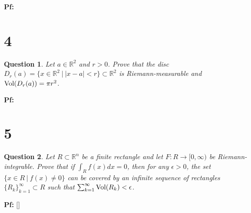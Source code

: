 \documentclass{article}
\newtheorem{question}{Question}
\begin{document}
\textbf{Pf:}

\break

\section*{4}
\begin{myBox}[]{}
    \begin{question}
        Let $a\in\mathbb{R}^2$ and $r>0$. Prove that the disc $D_r(a)=\{x\in\mathbb{R}^2\ |\ |x-a|<r\}\subset\mathbb{R}^2$ is Riemann-measurable and $\textmd{Vol}(D_r(a))=\pi r^2$.
    \end{question}
\end{myBox}

\textbf{Pf:}

\break

\section*{5}
\begin{myBox}[]{}
    \begin{question}
        Let $R\subset\mathbb{R}^n$ be a finite rectangle and let $F:R\rightarrow[0,\infty)$ be Riemann-integrable. Prove that if $\int_Rf(x)dx = 0$, then for any $\epsilon>0$, the set $\{x\in R\ |\ f(x)\neq 0\}$ can be covered by an infinite sequence of rectangles $\{R_k\}_{k=1}^{\infty}\subset R$ such that $\sum_{k=1}^{\infty}\textmd{Vol}(R_k)<\epsilon$.
    \end{question}
\end{myBox}

\textbf{Pf:}
[]
\end{document}
